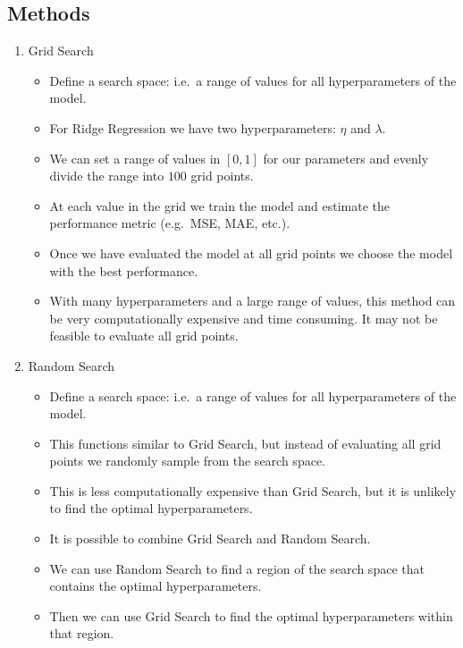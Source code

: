 \documentclass[12pt]{article}
\begin{document}
        \subsection{Methods}
            \begin{enumerate}
                \item Grid Search
                \begin{itemize}
                    \item Define a search space: i.e.\ a range of values for all hyperparameters of the model.
                    \item For Ridge Regression we have two hyperparameters: $\eta$ and $\lambda$.
                    \item We can set a range of values in $[0, 1]$ for our parameters and evenly divide the range into $100$ grid points.
                    \item At each value in the grid we train the model and estimate the performance metric (e.g.\ MSE, MAE, etc.).
                    \item Once we have evaluated the model at all grid points we choose the model with the best performance.
                    \item With many hyperparameters and a large range of values, this method can be very computationally expensive and time consuming. It may not be feasible to evaluate all grid points.
                \end{itemize}
                \item Random Search
                \begin{itemize}
                    \item Define a search space: i.e.\ a range of values for all hyperparameters of the model.
                    \item This functions similar to Grid Search, but instead of evaluating all grid points we randomly sample from the search space.
                    \item This is less computationally expensive than Grid Search, but it is unlikely to find the optimal hyperparameters.
                    \item It is possible to combine Grid Search and Random Search.
                    \item We can use Random Search to find a region of the search space that contains the optimal hyperparameters.
                    \item Then we can use Grid Search to find the optimal hyperparameters within that region.

\end{itemize}
\end{enumerate}
\end{document}
